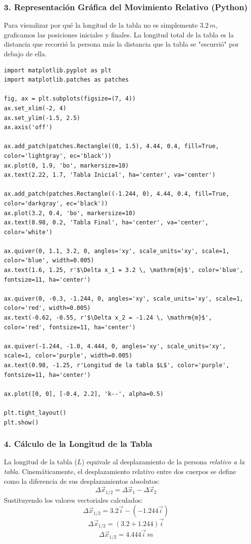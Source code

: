 \documentclass[12pt, a4paper]{article}
\begin{document}
\subsubsection*{3. Representación Gráfica del Movimiento Relativo (Python)}
Para visualizar por qué la longitud de la tabla no es simplemente $3.2 \, \si{m}$, graficamos las posiciones iniciales y finales. La longitud total de la tabla es la distancia que recorrió la persona más la distancia que la tabla se "escurrió" por debajo de ella.

\begin{lstlisting}
import matplotlib.pyplot as plt
import matplotlib.patches as patches

fig, ax = plt.subplots(figsize=(7, 4))
ax.set_xlim(-2, 4)
ax.set_ylim(-1.5, 2.5)
ax.axis('off')

ax.add_patch(patches.Rectangle((0, 1.5), 4.44, 0.4, fill=True, color='lightgray', ec='black'))
ax.plot(0, 1.9, 'bo', markersize=10)
ax.text(2.22, 1.7, 'Tabla Inicial', ha='center', va='center')

ax.add_patch(patches.Rectangle((-1.244, 0), 4.44, 0.4, fill=True, color='darkgray', ec='black'))
ax.plot(3.2, 0.4, 'bo', markersize=10)
ax.text(0.98, 0.2, 'Tabla Final', ha='center', va='center', color='white')

ax.quiver(0, 1.1, 3.2, 0, angles='xy', scale_units='xy', scale=1, color='blue', width=0.005)
ax.text(1.6, 1.25, r'$\Delta x_1 = 3.2 \, \mathrm{m}$', color='blue', fontsize=11, ha='center')

ax.quiver(0, -0.3, -1.244, 0, angles='xy', scale_units='xy', scale=1, color='red', width=0.005)
ax.text(-0.62, -0.55, r'$\Delta x_2 = -1.24 \, \mathrm{m}$', color='red', fontsize=11, ha='center')

ax.quiver(-1.244, -1.0, 4.444, 0, angles='xy', scale_units='xy', scale=1, color='purple', width=0.005)
ax.text(0.98, -1.25, r'Longitud de la tabla $L$', color='purple', fontsize=11, ha='center')

ax.plot([0, 0], [-0.4, 2.2], 'k--', alpha=0.5)

plt.tight_layout()
plt.show()
\end{lstlisting}

\subsubsection*{4. Cálculo de la Longitud de la Tabla}
La longitud de la tabla ($L$) equivale al desplazamiento de la persona \textit{relativo a la tabla}. Cinemáticamente, el desplazamiento relativo entre dos cuerpos se define como la diferencia de sus desplazamientos absolutos:
\[ \Delta\vec{x}_{1/2} = \Delta\vec{x}_1 - \Delta\vec{x}_2 \]
Sustituyendo los valores vectoriales calculados:
\[ \Delta\vec{x}_{1/2} = 3.2\vec{i} - (-1.244\vec{i}) \]
\[ \Delta\vec{x}_{1/2} = (3.2 + 1.244)\vec{i} \]
\[ \Delta\vec{x}_{1/2} = 4.444\vec{i} \, \si{m} \]
\end{document}
